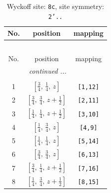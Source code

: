 \documentclass[fleqn,8pt]{jsarticle}
\begin{document}
\renewcommand{\arraystretch}{1.2}
\begin{longtable}{ccc}
\caption{Wyckoff site: {\tt 8c}, site symmetry: {\tt 2'..}}
 \\
 \hline \hline
No. & position & mapping \\ \hline \endfirsthead

\multicolumn{2}{l}{\tablename\ \thetable{}} \\
 \hline \hline
No. & position & mapping \\ \hline \endhead

 \hline \hline
\multicolumn{2}{r}{\footnotesize\it continued ...} \\ \endfoot

 \hline \hline
\multicolumn{2}{r}{} \\ \endlastfoot

1 & $\left[ \frac{3}{4},\, \frac{1}{4},\, z \right]$ & {\tt [1,12]} \\ \hline
2 & $\left[ \frac{3}{4},\, \frac{3}{4},\, z + \frac{1}{2} \right]$ & {\tt [2,11]} \\ \hline
3 & $\left[ \frac{1}{4},\, \frac{1}{4},\, z + \frac{1}{2} \right]$ & {\tt [3,10]} \\ \hline
4 & $\left[ \frac{1}{4},\, \frac{3}{4},\, z \right]$ & {\tt [4,9]} \\ \hline
5 & $\left[ \frac{1}{4},\, \frac{1}{4},\, z \right]$ & {\tt [5,14]} \\ \hline
6 & $\left[ \frac{3}{4},\, \frac{3}{4},\, z \right]$ & {\tt [6,13]} \\ \hline
7 & $\left[ \frac{3}{4},\, \frac{1}{4},\, z + \frac{1}{2} \right]$ & {\tt [7,16]} \\ \hline
8 & $\left[ \frac{1}{4},\, \frac{3}{4},\, z + \frac{1}{2} \right]$ & {\tt [8,15]} \\
\end{longtable}
\renewcommand{\arraystretch}{1.2}
\end{document}
